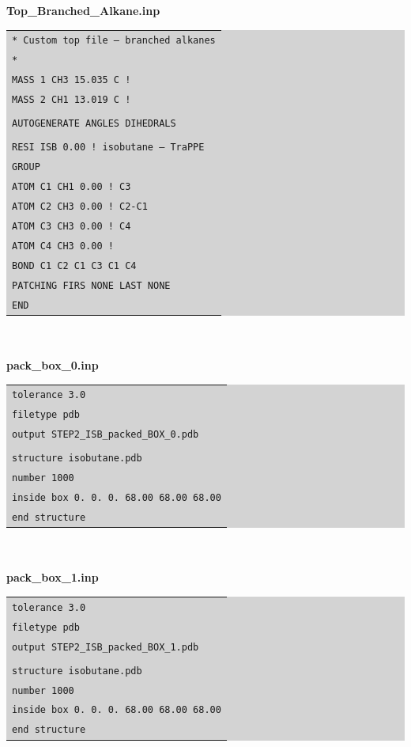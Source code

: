\newline
\textbf{Top\_Branched\_Alkane.inp}\\
\colorbox{lightgray}{
\begin{tabular}{l}
\texttt{* Custom top file -- branched alkanes}\\
\texttt{*}\\
\texttt{MASS   1  CH3    15.035 C  !}\\
\texttt{MASS   2  CH1    13.019 C  !}\\\\
\texttt{AUTOGENERATE ANGLES DIHEDRALS}\\\\
\texttt{RESI ISB        0.00 ! isobutane – TraPPE}\\
\texttt{GROUP}\\
\texttt{ATOM C1 CH1     0.00 !      C3}\\
\texttt{ATOM C2 CH3     0.00 ! C2-C1}\\
\texttt{ATOM C3 CH3     0.00 !      C4}\\
\texttt{ATOM C4 CH3     0.00 !}\\
\texttt{BOND C1 C2 C1 C3 C1 C4}\\
\texttt{PATCHING FIRS NONE LAST NONE}\\
\texttt{END}\\
\end{tabular}}\\\\
\newline
\textbf{pack\_box\_0.inp}\\
\colorbox{lightgray}{
\begin{tabular}{l}
\texttt{tolerance 3.0}\\
\texttt{filetype pdb}\\
\texttt{output STEP2\_ISB\_packed\_BOX\_0.pdb}\\
\texttt{}\\
\texttt{structure isobutane.pdb}\\
\texttt{number 1000 }\\
\texttt{inside box 0. 0. 0. 68.00 68.00 68.00}\\
\texttt{end structure}\\
\end{tabular}}\\\\
\newline
\textbf{pack\_box\_1.inp}\\
\colorbox{lightgray}{
\begin{tabular}{l}
\texttt{tolerance 3.0}\\
\texttt{filetype pdb}\\
\texttt{output STEP2\_ISB\_packed\_BOX\_1.pdb}\\
\texttt{}\\
\texttt{structure isobutane.pdb}\\
\texttt{number 1000 }\\
\texttt{inside box 0. 0. 0. 68.00 68.00 68.00}\\
\texttt{end structure}\\
\end{tabular}}\\\\
